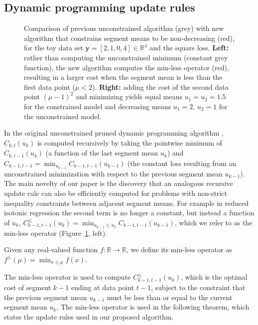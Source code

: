 \documentclass[twoside,11pt]{article}
\newcommand{\RR}{\mathbb R}
\begin{document}
\subsection{Dynamic programming update rules}
\label{sec:dyn-prog}

\begin{figure}[t!]
  \centering
  
  
  \vskip -0.5cm
  \caption{Comparison of previous unconstrained algorithm
    (\textcolor{Min}{grey}) with new algorithm that constrains segment
    means to be non-decreasing (\textcolor{Ckt}{red}), for the toy data
    set $\mathbf y= [ 2, 1, 0, 4 ] \in\RR^4$ and the square
    loss. \textbf{Left:} rather than computing the unconstrained
    minimum (constant grey function), the new algorithm computes the
    min-less operator (red), resulting in a larger cost when the
    segment mean is less than the first data point ($\mu <
    2$). \textbf{Right:} adding the cost of the second data point
    $(\mu-1)^2$ and minimizing yields equal means $u_1=u_2=1.5$ for
    the constrained model and decreasing means $u_1=2,\, u_2=1$ for
    the unconstrained model.}
  \label{fig:compare-unconstrained}
\end{figure}

In the original unconstrained pruned dynamic programming algorithm
\citep{pruned-dp}, $C_{k,t}(u_k)$ is computed recursively by taking
the pointwise minimum of $C_{k,t-1}(u_k)$ (a function of the last
segment mean $u_k$) and
$\hat C_{k-1,t-1} = \min_{u_{k-1}} C_{k-1,t-1}(u_{k-1})$ (the constant
loss resulting from an unconstrained minimization with respect to the
previous segment mean $u_{k-1}$). The main novelty of our paper is the
discovery that an analogous recursive update rule can also be
efficiently computed for problems with non-strict inequality constraints between adjacent segment means. For example in reduced
isotonic regression the second term is no longer a constant, but
instead a function of $u_k$,
$C_{k-1,t-1}^{\leq}(u_k) = \min_{u_{k-1}\leq u_k}
C_{k-1,t-1}(u_{k-1})$, which we refer to as the min-less operator
(Figure~\ref{fig:compare-unconstrained}, left).

\begin{definition}
\label{def:min-less}
  Given any real-valued function $f:\RR\rightarrow\RR$, we define its min-less
  operator as $f^\leq(\mu)=\min_{x\leq \mu} f(x)$.
\end{definition}

The min-less operator is used to compute $C_{k-1,t-1}^\leq(u_k)$,
which is the optimal cost of segment $k-1$ ending at data point $t-1$,
subject to the constraint that the previous segment mean $u_{k-1}$
must be less than or equal to the current segment mean $u_k$. The
min-less operator is used in the following theorem, which states the
update rules used in our proposed algorithm.
\end{document}
